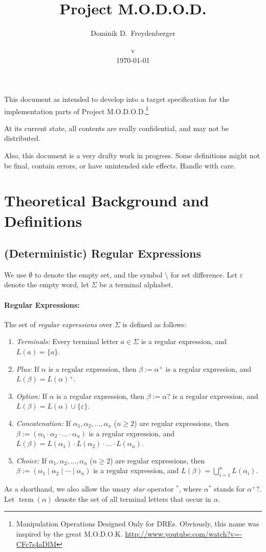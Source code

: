 \documentclass[a4paper,11pt, svgnames,titlepage]{article}
\date{v\svnfilerev\\ \today}
\title{Project M.O.D.O.D.}
\author{Dominik D.\ Freydenberger}
\newcommand{\rxp}{{^\mathtt{+}}}
\newcommand{\rxs}{{^\mathtt{*}}}
\newcommand{\rxo}{\mathtt{?}}
\newcommand{\rxc}{\cdot}
\DeclareMathOperator{\ror}{\mathtt{|}}
\newcommand{\emptyword}{\varepsilon}
\newcommand{\df}{:=}
\DeclareMathOperator{\term}{term}
\begin{document}
\maketitle
\pagestyle{fancy}

This document as intended to develop into a target specification for the implementation parts of Project M.O.D.O.D.\footnote{Manipulation Operations Designed Only for DREs. Obviously, this name was inspired by the great M.O.D.O.K. \url{http://www.youtube.com/watch?v=-CFc7s4aDlM}}

At its current state, all contents are really confidential, and may not be distributed.

Also, this document is a very drafty work in progress. Some definitions might not be final, contain errors, or have unintended side effects. Handle with care.
\section{Theoretical Background and Definitions}

\subsection{(Deterministic) Regular Expressions}\label{sec:dredef}
We use $\emptyset$ to denote the empty set, and the symbol $\setminus$ for set difference. Let $\emptyword$ denote the empty word, let $\Sigma$ be a terminal alphabet. 

\paragraph{Regular Expressions:} The set of \emph{regular expressions} over $\Sigma$ is defined as follows:
\begin{enumerate}
	\item \emph{Terminals:} Every terminal letter $a\in \Sigma$ is a regular expression, and $L(a)=\{a\}$.
	\item \emph{Plus:} If $\alpha$ is a regular expression, then $\beta\df\alpha\rxp$ is a regular expression, and $L(\beta)=L(\alpha)\rxp$.
	\item \emph{Option:} If $\alpha$ is a regular expression, then $\beta\df\alpha\rxo$ is a regular expression, and $L(\beta)=L(\alpha)\cup\{\emptyword\}$.
	\item \emph{Concatenation:} If $\alpha_1,\alpha_2,\ldots,\alpha_n$ ($n\geq 2$) are regular expressions, then $\beta\df(\alpha_1\rxc \alpha_2 \rxc \ldots \rxc \alpha_n)$ is a regular expression, and $L(\beta)=L(\alpha_1)\cdot L(\alpha_2)\cdot \ldots \cdot L(\alpha_n)$.
	\item \emph{Choice:} If $\alpha_1,\alpha_2,\ldots,\alpha_n$ ($n\geq 2$) are regular expressions, then $\beta\df(\alpha_1\ror \alpha_2 \ror \cdots \ror \alpha_n)$ is a regular expression, and $L(\beta)=\bigcup_{i=1}^{n} L(\alpha_i)$.
\end{enumerate}
As a shorthand, we also allow the unary \emph{star} operator $\rxs$, where $\alpha\rxs$ stands for $\alpha\rxp\rxo$. Let $\term(\alpha)$ denote the set of all terminal letters that occur in $\alpha$.
\end{document}
